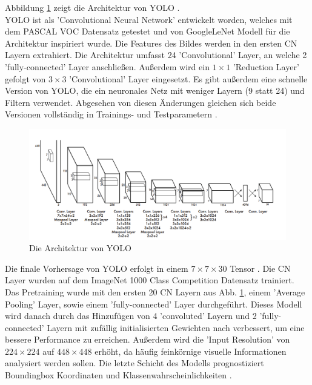 {{	Abbildung \ref{YOLO_Architecture} zeigt die Architektur von YOLO \citep{Redmon2016}. \\
	YOLO ist als 'Convolutional Neural Network' entwickelt worden, welches mit dem PASCAL VOC Datensatz getestet und von GoogleLeNet Modell für die Architektur inspiriert wurde. Die Features des Bildes werden in den ersten CN Layern extrahiert. Die Architektur umfasst 24 'Convolutional' Layer, an welche 2 'fully-connected' Layer anschließen. Außerdem wird ein $1 \times 1$ 'Reduction Layer' gefolgt von $3 \times 3$ 'Convolutional' Layer eingesetzt. Es gibt außerdem eine schnelle Version von YOLO, die ein neuronales Netz mit weniger Layern (9 statt 24) und Filtern verwendet. Abgesehen von diesen Änderungen gleichen sich beide Versionen vollständig in Trainings- und Testparametern \citep{Redmon2016}. \\
	\begin{figure}[h]
		\centering
		\includegraphics*[scale = 1.5, keepaspectratio]{images/YOLO/YOLO_network_arch.png}
		\caption[Die Architektur von YOLO]{Die Architektur von YOLO\citep{Redmon2016}}
		\label{YOLO_Architecture}
 	\end{figure}
	Die finale Vorhersage von YOLO erfolgt in einem $7 \times 7 \times 30$ Tensor \citep{Redmon2016}.
	Die CN Layer wurden auf dem \glqq ImageNet 1000 Class Competition\grqq{} Datensatz trainiert. Das Pretraining wurde mit den ersten 20 CN Layern aus Abb. \ref{YOLO_Architecture}, einem 'Average Pooling' Layer, sowie einem 'fully-connected' Layer durchgeführt. Dieses Modell wird danach durch das Hinzufügen von 4 'convoluted' Layern und 2 'fully-connected' Layern mit zufällig initialisierten Gewichten nach \cite{Ren2017}  \citep{Ren2017} verbessert, um eine bessere Performance zu erreichen. Außerdem wird die 'Input Resolution' von $224 \times 224$ auf $448  \times  448$ erhöht, da häufig feinkörnige visuelle Informationen analysiert werden sollen. Die letzte Schicht des Modells prognostiziert Boundingbox Koordinaten und Klassenwahrscheinlichkeiten \citep{Redmon2016}. \\
}}
